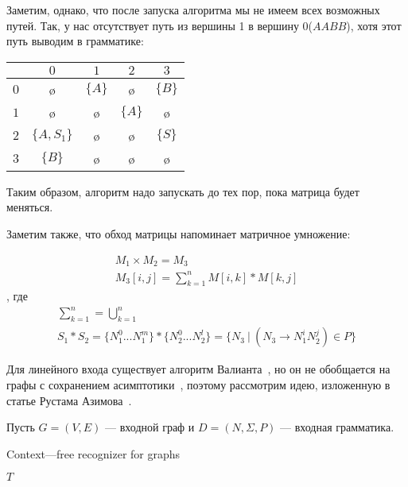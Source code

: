 Заметим, однако, что после запуска алгоритма мы не имеем всех возможных путей. Так, у нас отсутствует путь из вершины 1 в вершину 0($AABB$), хотя этот путь выводим в грамматике:

\begin{center}
	\begin{tabular}{c||cc|cc}
		& $0$ & $1$ & $2$ & $3$ \\ \hline \hline 
		$0$ & \o & $\{A\}$ & \o & $\{B\}$ \\ 
		$1$ & \o  & \o & $\{A\}$ & \o \\ 
		$2$ &  $\{A, S_1\}$ &  \o & \o & $\{S\}$ \\ \hline
		$3$ & $\{B\}$  & \o  & \o  & \o \\ 
	\end{tabular}
\end{center}

Таким образом, алгоритм надо запускать до тех пор, пока матрица будет меняться.

\smallskip

Заметим также, что обход матрицы напоминает матричное умножение:

\begin{gather*}
M_1 \times M_2 = M_3 \\
M_3[i,j] = \sum_{k=1}^{n} M[i,k] * M[k,j]
\end{gather*}
, где
\begin{gather*}
\sum_{k=1}^{n} = \bigcup_{k=1}^{n} \\
S_1 * S_2 = \{N_1^0 ... N_1^m\} * \{N_2^0 ... N_2^l\} = \{N_3~|~(N_3 \rightarrow N_1^i N_2^j) \in P\}
\end{gather*}

Для линейного входа существует алгоритм Валианта~\cite{Valiant:1975:GCR:1739932.1740048}, но он не обобщается на графы с сохранением асимптотики~\cite{Yannakakis}, поэтому рассмотрим идею, изложенную в статье Рустама Азимова~\cite{Azimov:2018:CPQ:3210259.3210264}.

Пусть $G = (V, E)$ --- входной граф и $D = (N,\Sigma,P)$ --- входная грамматика.

\begin{algorithm}[H]
\begin{algorithmic}[1]
\caption{Context---free recognizer for graphs}
\label{alg:graphParse}
    
    \EndFor    
       
    \EndWhile
\State \Return $T$
\EndFunction
\end{algorithmic}
\end{algorithm}



